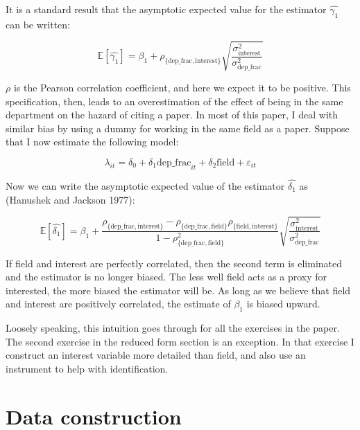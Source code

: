 It is a standard result that the asymptotic expected value for the
estimator $\hat{\gamma_1}$ can be written:

\begin{equation}
    \mathbb{E}[\hat{\gamma_1}] = \beta_1 + \rho_{\{\mbox{dep\_frac},\mbox{interest}\}} \sqrt{\frac{\sigma_{\mbox{interest}}^2}{\sigma_{\mbox{dep\_frac}}^2}}
\end{equation}

$\rho$ is the Pearson correlation coefficient, and here we expect it to
be positive. This specification, then, leads to an overestimation of the
effect of being in the same department on the hazard of citing a paper.
In most of this paper, I deal with similar bias by using a dummy for
working in the same field as a paper. Suppose that I now estimate the
following model:

\begin{equation}
    \lambda_{it} = \delta_0 + \delta_1 \mbox{dep\_frac}_{it} + \delta_2 \mbox{field} + \varepsilon_{it}
\end{equation}

Now we can write the asymptotic expected value of the estimator
$\hat{\delta_1}$ as (Hanushek and Jackson 1977):

\begin{equation}
    \mathbb{E}[\hat{\delta_1}] = \beta_1 + \frac{\rho_{\{\mbox{dep\_frac},\mbox{interest}\}} - \rho_{\{\mbox{dep\_frac},\mbox{field}\}}\rho_{\{\mbox{field},\mbox{interest}\}}}{1 - \rho_{\{\mbox{dep\_frac},\mbox{field}\}}^2} \sqrt{\frac{\sigma_{\mbox{interest}}^2}{\sigma_{\mbox{dep\_frac}}^2}}
\end{equation}

If field and interest are perfectly correlated, then the second term is
eliminated and the estimator is no longer biased. The less well field
acts as a proxy for interested, the more biased the estimator will be.
As long as we believe that field and interest are positively correlated,
the estimate of $\beta_1$ is biased upward.

Loosely speaking, this intuition goes through for all the exercises in
the paper. The second exercise in the reduced form section is an
exception. In that exercise I construct an interest variable more
detailed than field, and also use an instrument to help with
identification.

\section{Data construction}
\label{sec:dat_cons}

